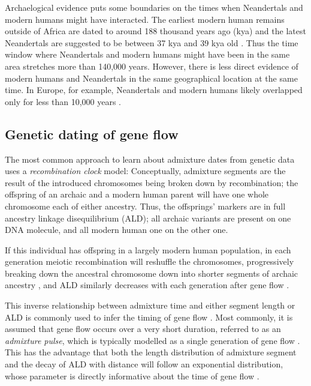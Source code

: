 \documentclass[11pt]{article}
\begin{document}
 
Archaelogical evidence puts some boundaries on the times when Neandertals and modern humans might have interacted. The earliest modern human remains outside of Africa are dated to around 188 thousand years ago (kya)  \citep{hershkovitz_earliest_2018,stringer_when_2018} and the latest Neandertals are suggested to be between 37 kya and 39 kya old \citep{higham_timing_2014,zilhao_precise_2017}. Thus the time window where Neandertals and modern humans might have been in the same area stretches more than 140,000 years. However, there is less direct evidence of modern humans and Neandertals in the same geographical location at the same time. In Europe, for example, Neandertals and modern humans likely overlapped only for less than 10,000 years \citep{bard_extended_2020}. 

\subsection{Genetic dating of gene flow}\label{Admixture models}

The most common approach to learn about admixture dates from genetic data uses a \emph{recombination clock} model: Conceptually, admixture segments are the result of the introduced chromosomes being broken down by recombination; the offspring of an archaic and a modern human parent will have one whole chromosome each of either ancestry. Thus, the offsprings' markers are in full ancestry linkage disequilibrium (ALD); all archaic variants are present on one DNA molecule, and all modern human one on the other one.

If this individual has offspring in a largely modern human population, in each generation meiotic recombination will reshuffle the chromosomes, progressively breaking down the ancestral chromosome down into shorter segments of archaic ancestry \citep{falush_inference_2003, gravel_population_2012,liang_lengths_2014}, and ALD similarly decreases with each generation after gene flow \citep{chakraborty_admixture_1988,stephens_mapping_1994,wall_detecting_2000}.


This inverse relationship between admixture time and either segment length or ALD is commonly used to infer the timing of gene flow \citep{pool_inference_2009,moorjani_history_2011,pugach_dating_2011,gravel_population_2012,sankararaman_date_2012,loh_inferring_2013,hellenthal_genetic_2014,liang_lengths_2014,sankararaman_combined_2016,pugach_gateway_2018,jacobs_multiple_2019}. Most commonly, it is assumed that gene flow occurs over a very short duration, referred to as an \textit{admixture pulse}, which is typically modelled as a single generation of gene flow \citep[e.g][]{moorjani_history_2011}. This has the advantage that both the length distribution of admixture segment and the decay of ALD with distance will follow an exponential distribution, whose parameter is directly informative about the time of gene flow \citep{pool_inference_2009, liang_lengths_2014, gravel_population_2012}.
\end{document}
